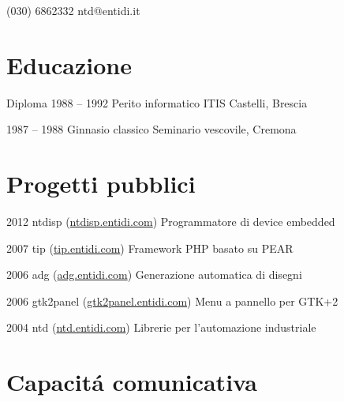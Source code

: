 \documentclass{tccv}
\begin{document}
\hfill
%
%
\begin{minipage}[t]{0.44\linewidth}
\vspace{0pt} %

    {(030) 6862332}
    {ntd@entidi.it}

\section{Educazione}

\begin{yearlist}

\item[Diploma]{1988 -- 1992}
     {Perito informatico}
     {ITIS Castelli, Brescia}

\item{1987 -- 1988}
     {Ginnasio classico}
     {Seminario vescovile, Cremona}

\end{yearlist}


\section{Progetti pubblici}

\begin{yearlist}

\item{2012}
     {ntdisp (\href{http://ntdisp.entidi.com/}{ntdisp.entidi.com})}
     {Programmatore di device embedded}

\item{2007}
     {tip (\href{http://tip.entidi.com/}{tip.entidi.com})}
     {Framework PHP basato su PEAR}

\item{2006}
     {adg (\href{http://adg.entidi.com/}{adg.entidi.com})}
     {Generazione automatica di disegni}

\item{2006}
     {gtk2panel (\href{http://gtk2panel.entidi.com/}{gtk2panel.entidi.com})}
     {Menu a pannello per GTK+2}

\item{2004}
     {ntd (\href{http://ntd.entidi.com/}{ntd.entidi.com})}
     {Librerie per l'automazione industriale}

\end{yearlist}

\section{Capacit\'a comunicativa}


\end{minipage}
\end{document}
